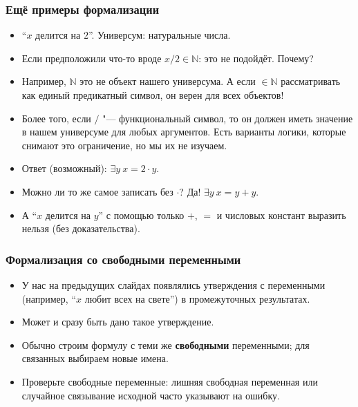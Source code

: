 \documentclass[10pt]{beamer}
\begin{document}
\begin{frame}
    \frametitle{Ещё примеры формализации}
    \begin{itemize}
        \item \enquote{$x$ делится на $2$}. Универсум: натуральные числа.
        \item Если предположили что-то вроде $x / 2 \in \mathbb{N}$: это не подойдёт. Почему? \pause
        \item Например, $\mathbb{N}$ это не объект нашего универсума. А если $\in \mathbb{N}$ рассматривать как единый предикатный символ, он верен для всех объектов! \pause 
        \item Более того, если $/$ "--- функциональный символ, то он должен иметь значение в нашем универсуме для любых аргументов. Есть варианты логики, которые снимают это ограничение, но мы их не изучаем. \pause
        \item Ответ (возможный): \pause $\exists y ~ x = 2 \cdot y$. \pause
        \item Можно ли то же самое записать без $\cdot$? \pause Да! $\exists y ~ x = y + y$. \pause
        \item А \enquote{$x$ делится на $y$} с помощью только $+$, $=$ и числовых констант выразить нельзя (без доказательства).
    \end{itemize}
 \end{frame}



 
\begin{frame}
   \frametitle{Формализация со свободными переменными}
   \begin{itemize}
       \item У нас на предыдущих слайдах появлялись утверждения с переменными (например, \enquote{$x$ любит всех на свете}) в промежуточных результатах. 
       \item Может и сразу быть дано такое утверждение. \pause
       \item Обычно строим формулу с теми же \textbf<3->{свободными} переменными; для связанных выбираем новые имена. \pause
       \item Проверьте свободные переменные: лишняя свободная переменная или случайное связывание исходной часто указывают на ошибку.
   \end{itemize}
\end{frame}
\end{document}
